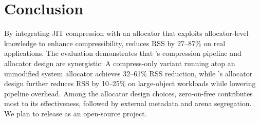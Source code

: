 \section{Conclusion}
\label{sec:conclusion}

By integrating JIT compression with an allocator that exploits
allocator-level knowledge to enhance compressibility, \sys reduces RSS
by 27--87\% on real applications. The evaluation demonstrates that
\sys{}'s compression pipeline and allocator design are synergistic: A
compress-only variant running atop an unmodified system allocator
achieves 32--61\% RSS reduction, while \sys's allocator design further
reduces RSS by 10--25\% on large-object workloads while lowering
pipeline overhead.  Among the allocator design choices, zero-on-free
contributes most to its effectiveness, followed by external metadata
and arena segregation. We plan to release \sys{} as an open-source project.

